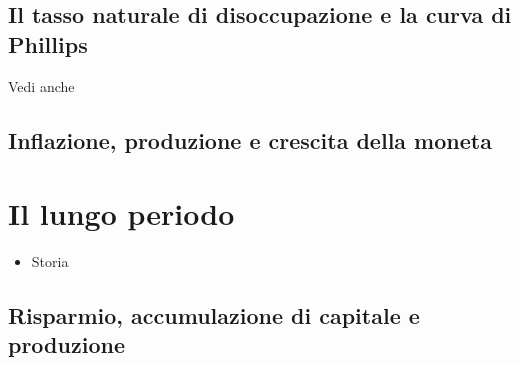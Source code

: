 \documentclass[letterpaper,10pt,italian]{jupyterBook}
\begin{document}
\sphinxAtStartPar
{}


\subsection{Il tasso naturale di disoccupazione e la curva di Phillips}
\label{\detokenize{ch/macro:il-tasso-naturale-di-disoccupazione-e-la-curva-di-phillips}}\label{\detokenize{ch/macro:economics-hs-macro-medium-run-unemployment-phillips}}
\sphinxAtStartPar
Vedi anche {\hyperref[\detokenize{ch/macro:economics-hs-macro-intro-macro-vars-phillips}]{}}

\sphinxAtStartPar
{}


\subsection{Inflazione, produzione e crescita della moneta}
\label{\detokenize{ch/macro:inflazione-produzione-e-crescita-della-moneta}}

\section{Il lungo periodo}
\label{\detokenize{ch/macro:il-lungo-periodo}}\label{\detokenize{ch/macro:economics-hs-macro-long-run}}\begin{itemize}
\item {} 
\sphinxAtStartPar
Storia

\end{itemize}


\subsection{Risparmio, accumulazione di capitale e produzione}
\label{\detokenize{ch/macro:risparmio-accumulazione-di-capitale-e-produzione}}\label{\detokenize{ch/macro:economics-hs-macro-long-run-savings}}
\end{document}
